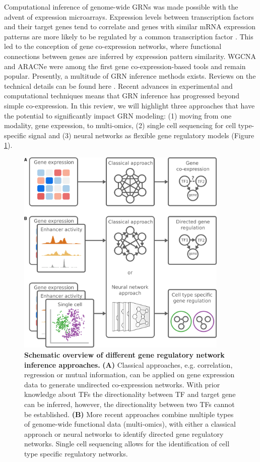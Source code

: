 Computational inference of genome-wide GRNs was made possible with the advent of expression microarrays. Expression levels between transcription factors and their target genes tend to correlate \cite{Ideker_2001} and genes with similar mRNA expression patterns are more likely to be regulated by a common transcription factor \cite{Allocco_2004,Eisen_1998}. This led to the conception of gene co-expression networks, where functional connections between genes are inferred by expression pattern similarity. WGCNA \cite{Zhang_2005} and ARACNe \cite{Margolin_2006} were among the first gene co-expression-based tools and remain popular. Presently, a multitude of GRN inference methods exists. Reviews on the technical details can be found here \cite{Levine_2005,Chasman_2017,Delgado_2019,Mercatelli_2020}. Recent advances in experimental and computational techniques means that GRN inference has progressed beyond simple co-expression. In this review, we will highlight three approaches that have the potential to significantly impact GRN modeling: (1) moving from one modality, gene expression, to multi-omics, (2) single cell sequencing for cell type-specific signal and (3) neural networks as flexible gene regulatory models (Figure \ref{fig:compapproach}).

\begin{figure}
	\centering
	\includegraphics[width=0.9\textwidth]{ch.compapproach/images/compapproach.png}
	\caption{\label{fig:compapproach}\textbf{Schematic overview of different gene regulatory network inference approaches.} \textbf{(A)} Classical approaches, e.g. correlation, regression or mutual information, can be applied on gene expression data to generate undirected co-expression networks. With prior knowledge about TFs the directionality between TF and target gene can be inferred, however, the directionality between two TFs cannot be established. \textbf{(B)} More recent approaches combine multiple types of genome-wide functional data (multi-omics), with either a classical approach or neural networks to identify directed gene regulatory networks. Single cell sequencing allows for the identification of cell type specific regulatory networks.}
\end{figure}

